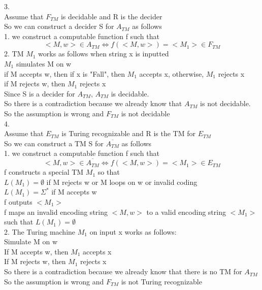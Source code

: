 \documentclass[a4paper]{article}
\begin{document}
3.\\
Assume that $F_{TM}$ is decidable and R is the decider\\
So we can construct a decider S for $A_{TM}$ as follows\\
1. we construct a computable function f such that\\
$$<M, w> \in A_{TM} \Leftrightarrow f(<M, w>)=<M_1> \in F_{TM}$$
2. TM $M_1$ works as follows when string x is inputted\\
$M_1$ simulates M on w\\
if M accepts w, then if x is "Fall", then $M_1$ accepts x, otherwise, $M_1$ rejects x\\
if M rejects w, then $M_1$ rejects x\\
Since S is a decider for $A_{TM}$, $A_{TM}$ is decidable. \\
So there is a contradiction because we already know that $A_{TM}$ is not decidable. \\
So the assumption is wrong and $F_{TM}$ is not decidable\\

4.\\
Assume that $E_{TM}$ is Turing recognizable and R is the TM for $E_{TM}$\\
So we can construct a TM S for $\overline{A_{TM}}$ as follows\\
1. we construct a computable function f such that\\
$$<M, w> \in \overline{A_{TM}} \Leftrightarrow f(<M, w>)=<M_1> \in E_{TM}$$
f constructs a special TM $M_1$ so that\\
$L(M_1)=\emptyset$ if M rejects w or M loops on w or invalid coding\\
$L(M_1)=\Sigma^*$ if M accepts w\\
f outputs $<M_1>$\\
f maps an invalid encoding string $<M, w>$ to a valid encoding string $<M_1>$ such that $L(M_1)=\emptyset$\\
2. The Turing machine $M_1$ on input x works as follows:\\
Simulate M on w\\
If M accepts w, then $M_1$ accepts x\\
If M rejects w, then $M_1$ rejects x\\
So there is a contradiction because we already know that there is no TM for $A_{TM}$\\
So the assumption is wrong and $F_{TM}$ is not Turing recognizable\\
\end{document}
